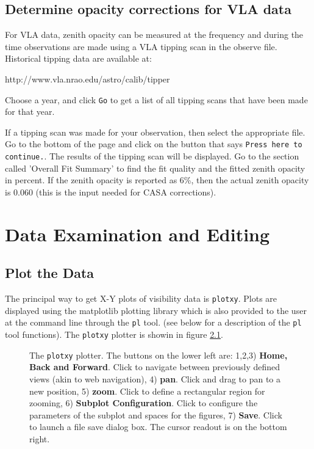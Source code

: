 \section{Determine opacity corrections for VLA data}
\label{section:opacity}

For VLA data, zenith opacity can be measured at the frequency
and during the time observations are made using a VLA tipping scan in
the observe file.  Historical tipping data are available at:

http://www.vla.nrao.edu/astro/calib/tipper

Choose a year, and click {\tt Go} to get a list of all tipping scans
that have been made for that year.

If a tipping scan was made for your observation, then select the
appropriate file.  Go to the bottom of the page and click on the
button that says {\tt Press here to continue.}.  The results of the
tipping scan will be displayed.  Go to the section called 'Overall Fit
Summary' to find the fit quality and the fitted zenith opacity in
percent.  If the zenith opacity is reported as 6\%, then the actual
zenith opacity is 0.060 (this is the input needed for CASA
corrections).


\chapter{Data Examination and Editing}
\label{chapter:edit}

\section{Plot the Data}
\label{section:plotting}

The principal way to get X-Y plots of visibility data is {\tt plotxy}.
Plots are displayed using the matplotlib plotting library which is
also provided to the user at the command line through the {\tt pl}
tool. (see below for a description of the {\tt pl} tool functions). 
The {\tt plotxy} plotter is showin in figure \ref{fig:matplotlib}.  

\begin{figure}[h!]
\caption{\label{fig:matplotlib}The {\tt plotxy} plotter. The buttons on the
  lower left are: 1,2,3) {\bf Home, Back and Forward}. Click to
  navigate between previously defined views (akin to web navigation),
  4) {\bf pan}. Click and drag to pan to a new position, 5) {\bf
  zoom}. Click to define a rectangular region for zooming, 6) {\bf
  Subplot Configuration}. Click to configure the parameters of the
  subplot and spaces for the figures, 7) {\bf Save}. Click to launch a
  file save dialog box. The cursor readout is on the bottom right.}
\hrulefill
\end{figure}


